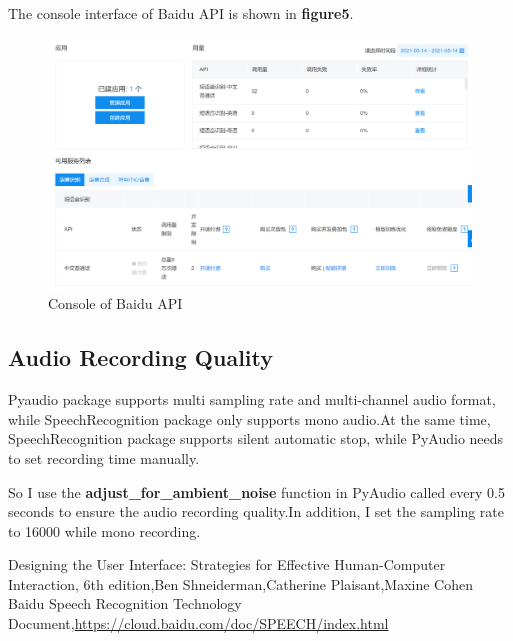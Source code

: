\documentclass{hci}
\begin{document}
The console interface of Baidu API is shown in \textbf{figure5}.
\begin{figure}[htb]
	\centering
	\includegraphics[width=1\linewidth]{../picture/14}
	\caption{Console of Baidu API}
	\label{figure15}
\end{figure}
\subsection{Audio Recording Quality}
Pyaudio package supports multi sampling rate and multi-channel audio format, while SpeechRecognition package only supports mono audio.At the same time, SpeechRecognition package supports silent automatic stop, while PyAudio needs to set recording time manually.

So I use the \textbf{adjust\_for\_ambient\_noise} function in PyAudio called every 0.5 seconds to ensure the audio recording quality.In addition, I set the sampling rate to 16000 while mono recording.

\begin{thebibliography}{99}
 Designing the User Interface: Strategies for Effective Human-Computer Interaction, 6th edition,Ben Shneiderman,Catherine Plaisant,Maxine Cohen
 Baidu Speech Recognition Technology Document,\url{https://cloud.baidu.com/doc/SPEECH/index.html}
\end{thebibliography}
\end{document}

